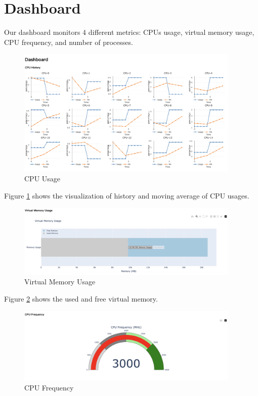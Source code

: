 \documentclass[11pt]{report}
\begin{document}
\newpage

\section{Dashboard}

Our dashboard monitors 4 different metrics: CPUs usage, virtual memory usage, CPU frequency, and number of processes.

\begin{figure}[!htbp]
    \centering
    \includegraphics[width=0.95\textwidth]{figures/cpu-usage.png}
    \caption{CPU Usage}
    \label{fig:cpu-usage}
\end{figure}

Figure \ref{fig:cpu-usage} shows the visualization of history and moving average of CPU usages.

\begin{figure}[!htbp]
    \centering
    \includegraphics[width=0.95\textwidth]{figures/virtual-memory.png}
    \caption{Virtual Memory Usage}
    \label{fig:virtual-memory}
\end{figure}

Figure \ref{fig:virtual-memory} shows the used and free virtual memory. 

\begin{figure}[!htbp]
    \centering
    \includegraphics[width=0.95\textwidth]{figures/cpu-freq.png}
    \caption{CPU Frequency}
    \label{fig:cpu-freq}
\end{figure}
\end{document}
